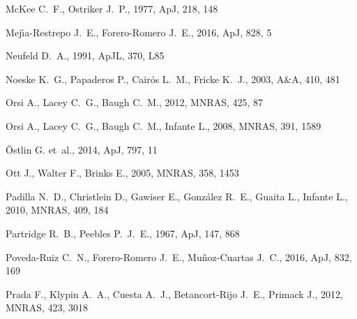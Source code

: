 \documentclass[a4,useAMS,usenatbib,usegraphicx]{mn2e}
\newcommand{\apj}{ApJ}
\newcommand{\apjl}{ApJL}
\newcommand{\mnras}{MNRAS}
\newcommand{\aap}{A\&A}
\begin{document}
\begin{thebibliography}{}
{McKee} C.~F.,  {Ostriker} J.~P.,  1977, \apj, 218, 148

{Mej{\'{\i}}a-Restrepo} J.~E.,  {Forero-Romero} J.~E.,  2016, \apj, 828, 5

{Neufeld} D.~A.,  1991, \apjl, 370, L85

{Noeske} K.~G.,  {Papaderos} P.,  {Cair{\'o}s} L.~M.,    {Fricke} K.~J.,  2003,
  \aap, 410, 481

{Orsi} A.,  {Lacey} C.~G.,    {Baugh} C.~M.,  2012, \mnras, 425, 87

{Orsi} A.,  {Lacey} C.~G.,  {Baugh} C.~M.,    {Infante} L.,  2008, \mnras, 391,
  1589

{{\"O}stlin} G.  et~al., 2014, \apj, 797, 11

{Ott} J.,  {Walter} F.,    {Brinks} E.,  2005, \mnras, 358, 1453

{Padilla} N.~D.,  {Christlein} D.,  {Gawiser} E.,  {Gonz{\'a}lez} R.~E.,
  {Guaita} L.,    {Infante} L.,  2010, \mnras, 409, 184

{Partridge} R.~B.,  {Peebles} P.~J.~E.,  1967, \apj, 147, 868

{Poveda-Ruiz} C.~N.,  {Forero-Romero} J.~E.,    {Mu{\~n}oz-Cuartas} J.~C.,
  2016, \apj, 832, 169

{Prada} F.,  {Klypin} A.~A.,  {Cuesta} A.~J.,  {Betancort-Rijo} J.~E.,
  {Primack} J.,  2012, \mnras, 423, 3018


\end{thebibliography}
\end{document}
